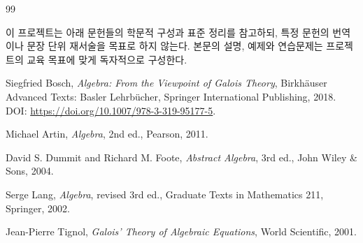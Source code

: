 \renewcommand{\bibname}{참고문헌}
\begin{thebibliography}{99}

\item[]
이 프로젝트는 아래 문헌들의 학문적 구성과 표준 정리를 참고하되, 특정 문헌의 번역이나 문장 단위 재서술을 목표로 하지 않는다. 본문의 설명, 예제와 연습문제는 프로젝트의 교육 목표에 맞게 독자적으로 구성한다.

Siegfried Bosch,
\emph{Algebra: From the Viewpoint of Galois Theory},
Birkh\"auser Advanced Texts: Basler Lehrb\"ucher,
Springer International Publishing, 2018.
\newblock DOI: \url{https://doi.org/10.1007/978-3-319-95177-5}.

Michael Artin,
\emph{Algebra}, 2nd ed.,
Pearson, 2011.

David S. Dummit and Richard M. Foote,
\emph{Abstract Algebra}, 3rd ed.,
John Wiley \& Sons, 2004.

Serge Lang,
\emph{Algebra}, revised 3rd ed.,
Graduate Texts in Mathematics 211,
Springer, 2002.

Jean-Pierre Tignol,
\emph{Galois' Theory of Algebraic Equations},
World Scientific, 2001.

\end{thebibliography}
